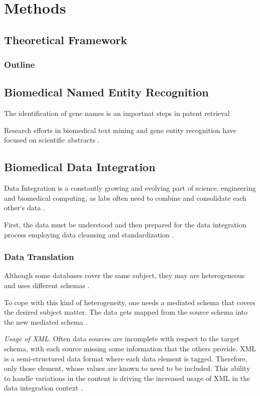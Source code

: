 \part{Methods}

\chapter{Theoretical Framework}
\label{cha:theory}

\section{Outline}

\chapter{Biomedical Named Entity Recognition}

The identification of gene names is an importnat steps in patent retrieval

Research efforts in biomedical text mining and gene entity recognition have focused on scientific abstracts \cite{RodriguezEsteban2016TextMP}.

\chapter{Biomedical Data Integration}

Data Integration is a constantly growing and evolving part of science, engineering and biomedical computing, as labs often need to combine and consolidate each other`s data \cite{Bernstein2008InformationII}.

First, the data must be understood and then prepared for the data integration process employing data cleansing and standardization \cite{Bernstein2008InformationII}.

\section{Data Translation}

Although some databases cover the same subject, they may are heterogeneous and uses different schemas \cite{Bernstein2008InformationII}.

To cope with this kind of heterogeneity, one needs a mediated schema that covers the desired subject matter. The data gets mapped from the source schema into the new mediated schema \cite{Bernstein2008InformationII}.

\textit{Usage of XML.} Often data sources are incomplete with respect to the target schema, with each source missing some information that the others provide. XML is a semi-structured data format where each data element is tagged. Therefore, only those element, whose values are known to need to be included. This ability to handle variations in the content is driving the increased usage of XML in the data integration context \cite{Bernstein2008InformationII}.


